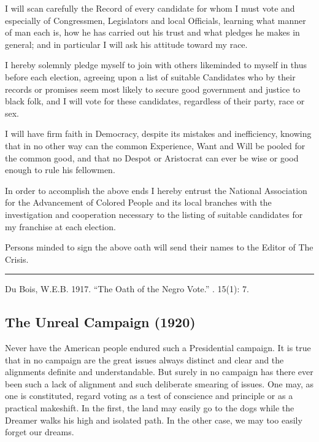 \documentclass[letterpaper,10pt,english]{jupyterBook}
\begin{document}
\sphinxAtStartPar
I will scan carefully the Record of every candidate for whom I must vote and especially of Congressmen, Legislators and local Officials, learning what manner of man each is, how he has carried out his trust and what pledges he makes in general; and in particular I will ask his attitude toward my race.

\sphinxAtStartPar
I hereby solemnly pledge myself to join with others like\sphinxhyphen{}minded to myself in thus before each election, agreeing upon a list of suitable Candidates who by their records or promises seem most likely to secure good government and justice to black folk, and I will vote for these candidates, regardless of their party, race or sex.

\sphinxAtStartPar
I will have firm faith in Democracy, despite its mistakes and inefficiency, knowing that in no other way can the common Experience, Want and Will be pooled for the common good, and that no Despot or Aristocrat can ever be wise or good enough to rule his fellowmen.

\sphinxAtStartPar
In order to accomplish the above ends I hereby entrust the National Association for the Advancement of Colored People and its local branches with the investigation and co\sphinxhyphen{}operation necessary to the listing of suitable candidates for my franchise at each election.

\sphinxAtStartPar
Persons minded to sign the above oath will send their names to the Editor of The Crisis.


\bigskip\hrule\bigskip


\sphinxAtStartPar
{} Du Bois, W.E.B. 1917. “The Oath of the Negro Vote.” . 15(1): 7.


\subsection{The Unreal Campaign (1920)}
\label{\detokenize{Volumes/21/02/unreal_campaign:the-unreal-campaign-1920}}\label{\detokenize{Volumes/21/02/unreal_campaign::doc}}
\sphinxAtStartPar
Never have the American people endured such a Presidential campaign. It is true that in no campaign are the great issues always distinct and clear and the alignments definite and understandable. But surely in no campaign has there ever been such a lack of alignment and such deliberate smearing of issues. One may, as one is constituted, regard voting as a test of conscience and principle or as a practical make\sphinxhyphen{}shift. In the first, the land may easily go to the dogs while the Dreamer walks his high and isolated path. In the other case, we may too easily forget our dreams.
\end{document}
